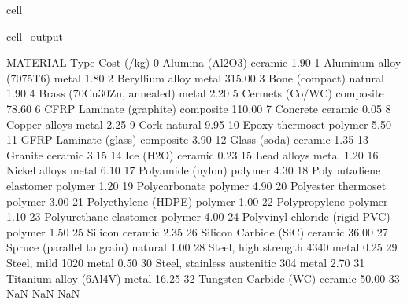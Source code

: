 \documentclass[letterpaper,10pt,english]{jupyterBook}
\begin{document}
{{\begin{sphinxuseclass}{cell}
\begin{sphinxVerbatimOutput}
\begin{sphinxuseclass}{cell_output}
\begin{sphinxVerbatim}[commandchars=\\\{\}]
                           MATERIAL       Type   Cost (\PYGZdl{}/kg)   \PYGZbs{}
0                   Alumina (Al2O3)    ceramic           1.90   
1          Aluminum alloy (7075\PYGZhy{}T6)      metal           1.80   
2                   Beryllium alloy      metal         315.00   
3                    Bone (compact)    natural           1.90   
4        Brass (70Cu30Zn, annealed)      metal           2.20   
5                   Cermets (Co/WC)  composite          78.60   
6          CFRP Laminate (graphite)  composite         110.00   
7                          Concrete    ceramic           0.05   
8                     Copper alloys      metal           2.25   
9                              Cork    natural           9.95   
10                  Epoxy thermoset    polymer           5.50   
11            GFRP Laminate (glass)  composite           3.90   
12                     Glass (soda)    ceramic           1.35   
13                          Granite    ceramic           3.15   
14                        Ice (H2O)    ceramic           0.23   
15                      Lead alloys      metal           1.20   
16                    Nickel alloys      metal           6.10   
17                Polyamide (nylon)    polymer           4.30   
18          Polybutadiene elastomer    polymer           1.20   
19                    Polycarbonate    polymer           4.90   
20              Polyester thermoset    polymer           3.00   
21              Polyethylene (HDPE)    polymer           1.00   
22                    Polypropylene    polymer           1.10   
23           Polyurethane elastomer    polymer           4.00   
24   Polyvinyl chloride (rigid PVC)    polymer           1.50   
25                          Silicon    ceramic           2.35   
26            Silicon Carbide (SiC)    ceramic          36.00   
27       Spruce (parallel to grain)    natural           1.00   
28        Steel, high strength 4340      metal           0.25   
29                 Steel, mild 1020      metal           0.50   
30  Steel, stainless austenitic 304      metal           2.70   
31           Titanium alloy (6Al4V)      metal          16.25   
32            Tungsten Carbide (WC)    ceramic          50.00   
33                              NaN        NaN            NaN   


\end{sphinxVerbatim}
\end{sphinxuseclass}
\end{sphinxVerbatimOutput}
\end{sphinxuseclass}}}
\end{document}
